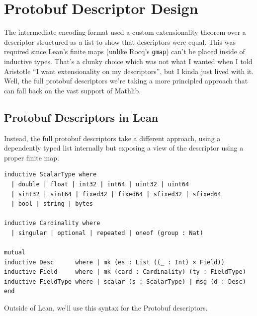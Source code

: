 \section{Protobuf Descriptor Design}\label{sec:proto-desc}

The intermediate encoding format used a custom extensionality theorem over a
descriptor structured as a list to show that descriptors were equal. This was
required since Lean's finite maps (unlike Rocq's \texttt{gmap}) can't be placed
inside of inductive types. That's a clunky choice which was not what I wanted
when I told Aristotle ``I want extensionality on my descriptors'', but I kinda
just lived with it. Well, the full protobuf descriptors we're taking a more
principled approach that can fall back on the vast support of Mathlib.

\subsection{Protobuf Descriptors in Lean}

Instead, the full protobuf descriptors take a different approach, using a
dependently typed list internally but exposing a view of the descriptor using a
proper finite map.

\begin{verbatim}
inductive ScalarType where
  | double | float | int32 | int64 | uint32 | uint64
  | sint32 | sint64 | fixed32 | fixed64 | sfixed32 | sfixed64
  | bool | string | bytes

inductive Cardinality where
  | singular | optional | repeated | oneof (group : Nat)

mutual
inductive Desc      where | mk (es : List ((_ : Int) × Field))
inductive Field     where | mk (card : Cardinality) (ty : FieldType)
inductive FieldType where | scalar (s : ScalarType) | msg (d : Desc)
end
\end{verbatim}

Outside of Lean, we'll use this syntax for the Protobuf descriptors.

